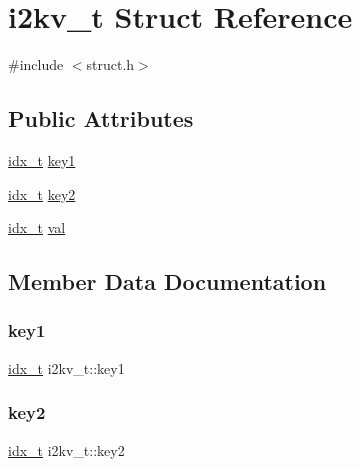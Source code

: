 \hypertarget{structi2kv__t}{}\section{i2kv\+\_\+t Struct Reference}
\label{structi2kv__t}


{\ttfamily \#include $<$struct.\+h$>$}

\subsection*{Public Attributes}
\begin{DoxyCompactItemize}
\item 
\hyperlink{3rd_party_2parmetis-4_80_83_2metis_2include_2metis_8h_aaa5262be3e700770163401acb0150f52}{idx\+\_\+t} \hyperlink{structi2kv__t_a8a1d36b378c883ebbfaea2702ab30160}{key1}
\item 
\hyperlink{3rd_party_2parmetis-4_80_83_2metis_2include_2metis_8h_aaa5262be3e700770163401acb0150f52}{idx\+\_\+t} \hyperlink{structi2kv__t_a431cab38e5c7ed64f569f5df89b1f2bc}{key2}
\item 
\hyperlink{3rd_party_2parmetis-4_80_83_2metis_2include_2metis_8h_aaa5262be3e700770163401acb0150f52}{idx\+\_\+t} \hyperlink{structi2kv__t_a713071e870631537fdc2e95b01c00176}{val}
\end{DoxyCompactItemize}


\subsection{Member Data Documentation}
\mbox{\label{structi2kv__t_a8a1d36b378c883ebbfaea2702ab30160}} 
\subsubsection{\texorpdfstring{key1}{key1}}
{\footnotesize\ttfamily \hyperlink{3rd_party_2parmetis-4_80_83_2metis_2include_2metis_8h_aaa5262be3e700770163401acb0150f52}{idx\+\_\+t} i2kv\+\_\+t\+::key1}

\mbox{\label{structi2kv__t_a431cab38e5c7ed64f569f5df89b1f2bc}} 
\subsubsection{\texorpdfstring{key2}{key2}}
{\footnotesize\ttfamily \hyperlink{3rd_party_2parmetis-4_80_83_2metis_2include_2metis_8h_aaa5262be3e700770163401acb0150f52}{idx\+\_\+t} i2kv\+\_\+t\+::key2}

